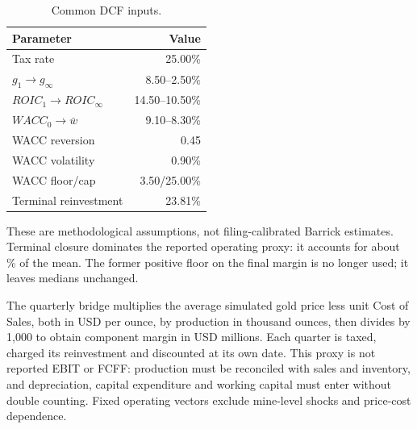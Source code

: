 \begin{table}[H]
\centering
\caption{Common DCF inputs.}
\label{tab:dcf_inputs}
\begin{tabularx}{\columnwidth}{@{}Xr@{}}
\toprule
Parameter & Value \\
\midrule
Tax rate & 25.00\% \\
$g_1\rightarrow g_\infty$ & 8.50--2.50\% \\
$ROIC_1\rightarrow ROIC_\infty$ & 14.50--10.50\% \\
$WACC_0\rightarrow\bar w$ & 9.10--8.30\% \\
WACC reversion & 0.45 \\
WACC volatility & 0.90\% \\
WACC floor/cap & 3.50/25.00\% \\
Terminal reinvestment & 23.81\% \\
\bottomrule
\end{tabularx}
\end{table}

\begin{methodbox}[Interpretation]
These are methodological assumptions, not filing-calibrated Barrick estimates. Terminal closure dominates the reported operating proxy: it accounts for about \TerminalShare\% of the mean. The former positive floor on the final margin is no longer used; it leaves medians unchanged.
\end{methodbox}

The quarterly bridge multiplies the average simulated gold price less unit Cost of Sales, both in USD per ounce, by production in thousand ounces, then divides by 1,000 to obtain component margin in USD millions. Each quarter is taxed, charged its reinvestment and discounted at its own date. This proxy is not reported EBIT or FCFF: production must be reconciled with sales and inventory, and depreciation, capital expenditure and working capital must enter without double counting. Fixed operating vectors exclude mine-level shocks and price-cost dependence.
